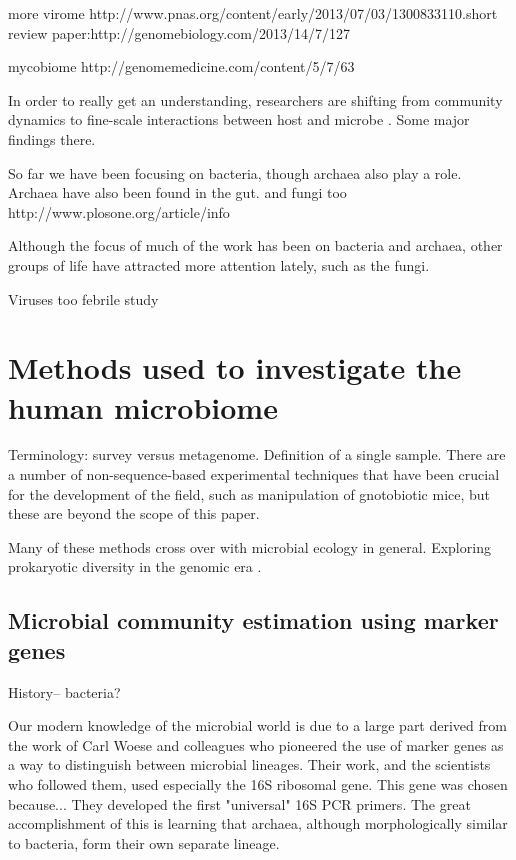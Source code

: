 \documentclass{amsart}
\begin{document}
more virome
http://www.pnas.org/content/early/2013/07/03/1300833110.short
review paper:http://genomebiology.com/2013/14/7/127

mycobiome
http://genomemedicine.com/content/5/7/63


In order to really get an understanding, researchers are shifting from community dynamics to fine-scale interactions between host and microbe \cite{hooper2012interactions}.
Some major findings there.

So far we have been focusing on bacteria, though archaea also play a role.
Archaea have also been found in the gut.
and fungi too
http://www.plosone.org/article/info%

Although the focus of much of the work has been on bacteria and archaea, other groups of life have attracted more attention lately, such as the fungi.

Viruses too
febrile study \cite{wylie2012sequence}


\section{Methods used to investigate the human microbiome}

Terminology: survey versus metagenome.
Definition of a single sample.
There are a number of non-sequence-based experimental techniques that have been crucial for the development of the field, such as manipulation of gnotobiotic mice, but these are beyond the scope of this paper.

Many of these methods cross over with microbial ecology in general.
Exploring prokaryotic diversity in the genomic era \cite{hugenholtz2002review}.


\subsection{Microbial community estimation using marker genes}
History-- bacteria?

Our modern knowledge of the microbial world is due to a large part derived from the work of Carl Woese and colleagues who pioneered the use of marker genes as a way to distinguish between microbial lineages.
Their work, and the scientists who followed them, used especially the 16S ribosomal gene.
This gene was chosen because...
They developed the first "universal" 16S PCR primers.
The great accomplishment of this is learning that archaea, although morphologically similar to bacteria, form their own separate lineage.
\end{document}
